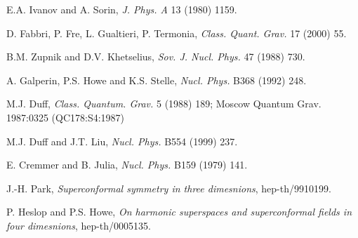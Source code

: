 \documentclass[a4paper,12pt]{article}
\begin{document}
\begin{thebibliography}{99}
 E.A. Ivanov and A. Sorin, {\it  J. Phys. A}  {13} (1980) 
1159. 

 D. Fabbri, P. Fre, L. Gualtieri, P. Termonia, 
{\it  Class. Quant. Grav.} 17 (2000) 55. 

 B.M. Zupnik and D.V. Khetselius,  {\it  Sov. J. Nucl. Phys.} 47  
(1988) 730. 

 A. Galperin, P.S. Howe and K.S. Stelle, {\it Nucl. Phys.}
 B368 (1992) 248.


 M.J. Duff, {\it Class. Quantum.  Grav.}
5 (1988) 189; Moscow Quantum Grav. 1987:0325 (QC178:S4:1987) 

 M.J. Duff and J.T. Liu, {\it Nucl. Phys.}
 B554 (1999) 237.

 E. Cremmer and B. Julia, {\it Nucl. Phys.}
 B159 (1979) 141.

 J.-H. Park, {\it Superconformal symmetry in three 
dimesnions}, hep-th/9910199.

 P. Heslop and P.S. Howe, 
{\it On harmonic superspaces and superconformal fields in four 
dimesnions}, hep-th/0005135. 



\end{thebibliography}
\end{document}
